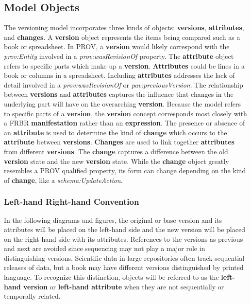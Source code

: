 \subsection{Model Objects}

The versioning model incorporates three kinds of objects: \textbf{versions}, \textbf{attribut\-es}, and \textbf{changes}.
A \textbf{version} object represents the items being compared such as a book or spreadsheet.
In PROV, a \textbf{version} would likely correspond with the \textit{prov:Entity} involved in a \textit{prov:wasRevisionOf} property.
The \textbf{attribute} object refers to specific parts which make up a \textbf{version}.
\textbf{Attributes} could be lines in a book or columns in a spreadsheet.
Including \textbf{attributes} addresses the lack of detail involved in a \textit{prov:wasRevisionOf} or \textit{pav:previousVersion}.
The relationship between \textbf{versions} and \textbf{attributes} captures the influence that changes in the underlying part will have on the overarching \textbf{version}.
Because the model refers to specific parts of a \textbf{version}, the \textbf{version} concept corresponds most closely with a FRBR \textbf{manifestation} rather than an \textbf{expression}.
The presence or absence of an \textbf{attribute} is used to determine the kind of \textbf{change} which occurs to the \textbf{attribute} between \textbf{versions}.
\textbf{Changes} are used to link together \textbf{attributes} from different \textbf{versions}.
The \textbf{change} captures a difference between the old \textbf{version} state and the new \textbf{version} state.
While the \textbf{change} object greatly resembles a PROV qualified property, its form can change depending on the kind of \textbf{change}, like a \textit{schema:UpdateAction}.

\subsubsection{Left-hand Right-hand Convention}

In the following diagrams and figures, the original or base version and its attributes will be placed on the left-hand side and the new version will be placed on the right-hand side with its attributes.
References to the versions as previous and next are avoided since sequencing may not play a major role in distinguishing versions.
Scientific data in large repositories often track sequential releases of data, but a book may have different versions distinguished by printed language.
To recognize this distinction, objects will be referred to as the \textbf{left-hand version} or \textbf{left-hand attribute} when they are not sequentially or temporally related.

